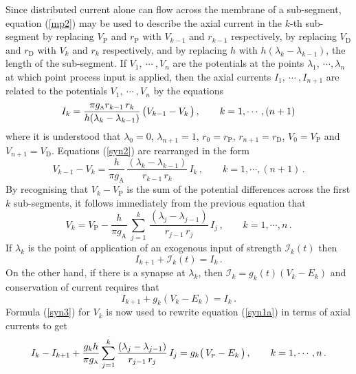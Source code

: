 Since distributed current alone can flow across the membrane of a
sub-segment, equation (\ref{mp2}) may be used to describe the
axial current in the $k$-th sub-segment by replacing
$V_\mathrm{P}$ and $r_\mathrm{P}$ with $V_{k-1}$ and $r_{k-1}$
respectively, by replacing $V_\mathrm{D}$ and $r_\mathrm{D}$ with
$V_k$ and $r_k$ respectively, and by replacing $h$ with
$h(\lambda_k- \lambda_{k-1})$, the length of the sub-segment. If
$V_1,\ \cdots\ ,V_n$ are the potentials at the points $\lambda_1,\
\cdots, \lambda_n$ at which point process input is applied, then
the axial currents $I_1,\ \cdots\ , I_{n+1}$ are related to the
potentials $V_1,\ \cdots\ ,V_n$ by the equations
\begin{equation}\label{syn2}
I_k = \displaystyle\frac{\pi g_{\mbox{\tiny A}}r_{k-1}\,r_k}
{h(\lambda_k-\lambda_{k-1})}\,\big(V_{k-1}-V_k\,\big)\,,\qquad
k=1,\cdots,(n+1)
\end{equation}
where it is understood that $\lambda_0=0$, $\lambda_{n+1}=1$,
$r_0=r_\mathrm{P}$, $r_{n+1}=r_\mathrm{D}$, $V_0=V_\mathrm{P}$ and
$V_{n+1}=V_\mathrm{D}$. Equations (\ref{syn2}) are rearranged in
the form
\[
V_{k-1}-V_k=\frac{h}{\pi g_\mathrm{A}}\,
\frac{(\lambda_k-\lambda_{k-1})}{r_{k-1}\,r_k}
\,I_k \,,\qquad k=1,\cdots,(n+1)\,.
\]
By recognising that $V_k-V_\mathrm{P}$ is the sum of the potential
differences across the first $k$ sub-segments, it follows
immediately from the previous equation that
\begin{equation}\label{syn3}
V_k = V_\mathrm{P} -\frac{h}{\pi g_\mathrm{A}}\,\sum_{j=1}^k \,
\frac{(\lambda_j-\lambda_{j-1})}{r_{j-1}\,r_j}\,I_j \,,\qquad
k=1,\cdots,n\,.
\end{equation}
If $\lambda_k$ is the point of application of an exogenous input
of strength $\mathcal{I}_k(t)$ then
\begin{equation}\label{syn1b}
I_{k+1}+\mathcal{I}_k(t) = I_k\,.
\end{equation}
On the other hand, if there is a synapse at $\lambda_k$, then
$\mathcal{I}_k=g_k(t)(V_k-E_k)$ and conservation of current
requires that
\begin{equation}\label{syn1a}
I_{k+1}+g_k(V_k-E_k) = I_k\,.
\end{equation}
Formula (\ref{syn3}) for $V_k$ is now used to rewrite equation
(\ref{syn1a}) in terms of axial currents to get
\begin{equation}\label{syn4}
I_k-I_{k+1}+\displaystyle\frac{g_k h}{\pi g_{\mbox{\tiny A}}}\sum_{j=1}^k
\frac{(\lambda_j-\lambda_{j-1})}{r_{j-1}\,r_j}\,I_j =
g_k\big(\,V_{\mbox{\tiny P}}-E_k\,\big)\,,\qquad k=1,\cdots,n\,.
\end{equation}

